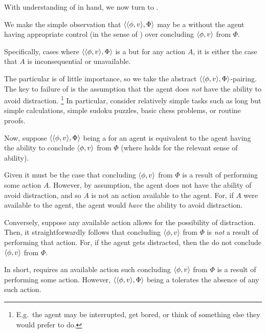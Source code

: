 \begin{note}
  With understanding of \AbControl{} in hand, we now turn to .

  We make the simple observation that \(\langle \langle \phi, v \rangle, \Phi \rangle\) may be a \fc{} without the agent having appropriate control (in the sense of \AbControl{}) over concluding \(\langle\phi, v\rangle\) from \(\Phi\).

  Specifically, cases where \(\langle \langle \phi, v \rangle, \Phi \rangle\) is a \fc{} but for any action \(A\), it is either the case that \(A\) is inconsequential or unavailable.

  The particular \fc{} is of little importance, so we take the abstract \(\langle \langle \phi, v \rangle, \Phi \rangle\)-pairing.
  The key to failure of \AbControl{} is the assumption that the agent does \emph{not} have the ability to avoid distraction.%
  \footnote{
    E.g.\ the agent may be interrupted, get bored, or think of something else they would prefer to do.
  }
  In particular, consider relatively simple tasks such as long but simple calculations, simple sudoku puzzles, basic chess problems, or routine proofs.

  Now, suppose \(\langle \langle \phi, v \rangle, \Phi \rangle\) being a  for an agent is equivalent to the agent having the ability to conclude \(\langle\phi, v\rangle\) from \(\Phi\) (where \AbControl{} holds for the relevant sense of ability).

  Given \AbControl{} it must be the case that concluding \(\langle\phi, v\rangle\) from \(\Phi\) is a result of performing some action \(A\).
  However, by assumption, the agent does not have the ability of avoid distraction, and so \(A\) is not an action available to the agent.
  For, if \(A\) were available to the agent, the agent would \emph{have} the ability to avoid distraction.

  Conversely, suppose any available action allows for the possibility of distraction.
  Then, it straightforwardly follows that concluding \(\langle\phi, v\rangle\) from \(\Phi\) is \emph{not} a result of performing that action.
  For, if the agent gets distracted, then the do not conclude \(\langle\phi, v\rangle\) from \(\Phi\).

  In short, \AbControl{} requires an available action such concluding \(\langle\phi, v\rangle\) from \(\Phi\) is a result of performing some action.
  However, \(\langle \langle \phi, v \rangle, \Phi \rangle\) being a \fc{} tolerates the absence of any such action.


\end{note}
